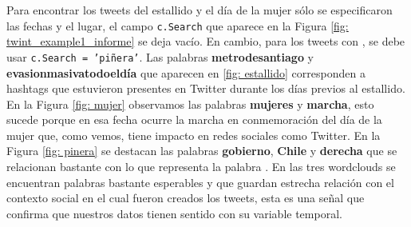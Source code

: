 \documentclass{article}
\begin{document}
   Para encontrar los tweets del estallido y el día de la mujer sólo se especificaron las fechas y el lugar, el campo \texttt{c.Search} que aparece en la Figura \ref{fig: twint_example1_informe} se deja vacío. En cambio, para los tweets con , se debe usar \texttt{c.Search = 'piñera'}. Las palabras \textbf{metrodesantiago} y \textbf{evasionmasivatodoeldía} que aparecen en \ref{fig: estallido} corresponden a hashtags que estuvieron presentes en Twitter durante los días previos al estallido. En la Figura \ref{fig: mujer} observamos las palabras \textbf{mujeres} y \textbf{marcha}, esto sucede porque en esa fecha ocurre la marcha en conmemoración del día de la mujer que, como vemos, tiene impacto en redes sociales como Twitter. En la Figura \ref{fig: pinera} se destacan las palabras \textbf{gobierno}, \textbf{Chile} y \textbf{derecha} que se relacionan bastante con lo que representa la palabra . En las tres wordclouds se encuentran palabras bastante esperables y que guardan estrecha relación con el contexto social en el cual fueron creados los tweets, esta es una señal que confirma que nuestros datos tienen sentido con su variable temporal.
    
\end{document}
